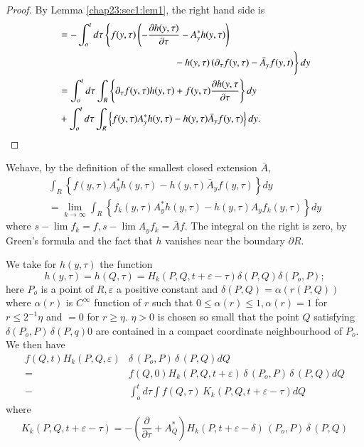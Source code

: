 \begin{proof}
 By Lemma \ref{chap23:sec1:lem1}, the right hand side is 
 \begin{align*}
  &=- \int^t_o d \tau \left\{ f(y, \tau) \left(- \frac{\partial h(y, \tau
   )}{\partial \tau} - A^*_y h(y, \tau )\right)\right.\\ 
  & \left.\vphantom{\frac{\partial}{\partial}} 
  \hspace{4cm} - h(y, \tau)\, 
  (\partial_\tau f(y, \tau) - \bar{A}_y f(y, t) \right\} dy\\ 
  &= \int_o^t d \tau \int_R \left\{ \partial_\tau f(y,\tau ) h(y, \tau)
  + f(y, \tau ) \frac{\partial h(y, \tau}{\partial \tau}\right\} dy\\ 
  &+ \int^t_o d \tau \int_R \left\{ f(y, \tau ) A^*_y h(y, \tau ) -
  h(y, \tau ) \bar{A}_y f(y, \tau )\right\} dy. 
 \end{align*}
\end{proof}

We\pageoriginale have, by the definition of the smallest closed extension $\bar{A}$, 
\begin{multline*}
 \int_R \left\{ f(y, \tau ) A^*_y h(y, \tau) - h(y, \tau ) \bar{A}_y
 f(y, \tau )\right\} dy \\ 
 = \lim_{k \to \infty} \int_R \left\{ f_k (y, \tau)A^*_y h(y, \tau) -
 h(y, \tau) A_y f_k(y, \tau ) \right\}dy 
\end{multline*}
where $s-\lim f_k = f, s-\lim A_y f_k= \bar{A} f$. The integral on the
right is zero, by Green's formula and the fact that $h$ vanishes
near the boundary $\partial R$. 

We take for $h(y, \tau)$ the function
$$
h(y, \tau)= h(Q, \tau)= H_k (P,Q, t+ \varepsilon - \tau ) \delta (P,Q)
\delta (P_o, P); 
$$
here $P_o$ is a point of $R, \varepsilon$ a positive constant and
$\delta (P, Q)= \alpha (r(P, Q))$ where $\alpha (r)$ is $C^\infty$
function of $r$ such that $0 \le \alpha (r) \leq 1, \alpha (r) =1$ for
$r \le 2^{-1} \eta$ and $=0$ for $r \ge \eta$. $\eta > 0$ is chosen so
small that the point $Q$ satisfying $\delta (P_o, P)\, \delta (P, q) 0$
are contained in a compact coordinate neighbourhood of $P_o$. We then
have 
\begin{align*}
  f(Q,t) H_k (P, Q,\varepsilon) & \delta\, (P_o, P) \,\delta\, (P,Q) d Q \\
 =&f(Q,0)H_k(P,Q, t + \varepsilon)\, \delta\, (P_o, P)\, \delta
 \,(P,Q) dQ\tag{2} \\ 
 -& \int^t_o d \tau \int f (Q, \tau )\, K_k (P, Q, t+ \varepsilon - \tau ) d Q
\end{align*}
where 
$$
K_k (P, Q, t+ \varepsilon - \tau )=- \left( \frac{\partial}{\partial \tau}+
A^*_Q\right) H_k (P, t + \varepsilon - \delta) \,(P_o, P)\, \delta\,(P,Q) 
$$

